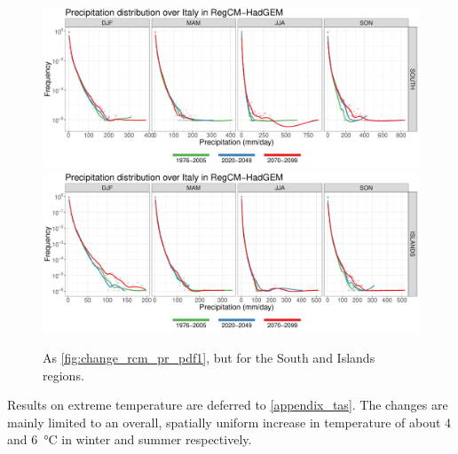 \begin{figure}
    \centering
        \includegraphics[width=0.8\textheight]{figures/change_rcm/pr/pdf_SOUTH_lines}
        \includegraphics[width=0.8\textheight]{figures/change_rcm/pr/pdf_ISLANDS_lines}
    \decoRule
    \caption[Projected change  of RegCM precipitation PDFs (2)]{
        As \cref{fig:change_rcm_pr_pdf1}, but for the South and Islands regions.
    }\label{fig:change_rcm_pr_pdf2}
\end{figure}

Results on extreme temperature are deferred to \cref{appendix_tas}. The changes are mainly limited to an overall, spatially uniform increase in temperature of about 4 and \SI{6}{\celsius} in winter and summer respectively.


